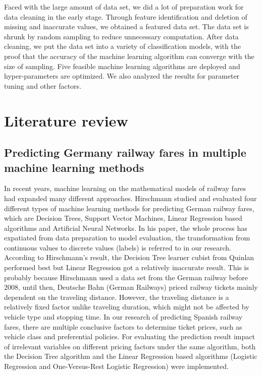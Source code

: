 \documentclass[conference]{IEEEtran}
\begin{document}
Faced with the large amount of data set, we did a lot of preparation work for data cleaning in the early stage. Through feature identification and deletion of missing and inaccurate values, we obtained a featured data set. The data set is shrunk by random sampling to reduce unnecessary computation. After data cleaning, we put the data set into a variety of classification models, with the proof that the accuracy of the machine learning algorithm can converge with the size of sampling. Five feasible machine learning algorithms are deployed and hyper-parameters are optimized. We also analyzed the results for parameter tuning and other factors.

\section{Literature review}
\subsection{Predicting Germany railway fares in multiple machine learning methods}
In recent years, machine learning on the mathematical models of railway fares had expanded many different approaches. Hirschmann \cite{b1} studied and evaluated four different types of machine learning methods for predicting German railway fares, which are Decision Trees, Support Vector Machines, Linear Regression based algorithms and Artificial Neural Networks. In his paper, the whole process has expatiated from data preparation to model evaluation, the transformation from continuous values to discrete values (labels) is referred to in our research. According to Hirschmann’s result, the Decision Tree learner cubist from Quinlan \cite{b4} performed best but Linear Regression \cite{b5} \cite{b6} got a relatively inaccurate result. This is probably because Hirschmann used a data set from the German railway before 2008, until then, Deutsche Bahn (German Railways) priced railway tickets mainly dependent on the traveling distance. However, the traveling distance is a relatively fixed factor unlike traveling duration, which might not be affected by vehicle type and stopping time. In our research of predicting Spanish railway fares, there are multiple conclusive factors to determine ticket prices, such as vehicle class and preferential policies. For evaluating the prediction result impact of irrelevant variables on different pricing factors under the same algorithm, both the Decision Tree algorithm and the Linear Regression based algorithms (Logistic Regression and One-Versus-Rest Logistic Regression) were implemented. 
\end{document}
